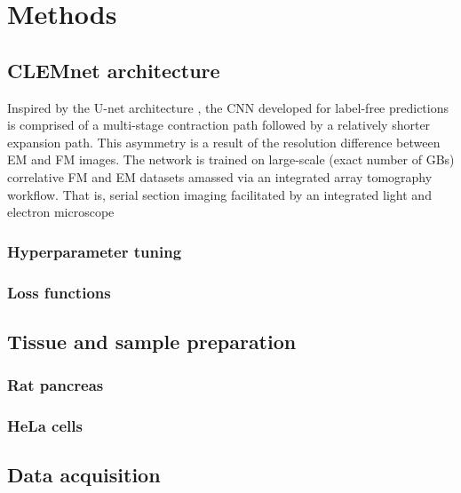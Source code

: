 \clearpage
\section{Methods}
\label{sec:4.4_methods}


\subsection{CLEMnet architecture}
\label{sec:4methods_architecture}

Inspired by the U-net architecture \cite{ronneberger2015u,ounkomol2018label}, the CNN developed for label-free predictions is comprised of a multi-stage contraction path followed by a relatively shorter expansion path. This asymmetry is a result of the resolution difference between EM and FM images. The network is trained on large-scale (exact number of GBs) correlative FM and EM datasets amassed via an integrated array tomography workflow. That is, serial section imaging facilitated by an integrated light and electron microscope \cite{liv2013simultaneous,lane2021optimization}


\subsubsection{Hyperparameter tuning}


\subsubsection{Loss functions}





\subsection{Tissue and sample preparation}
\label{sec:4methods_prep}

\subsubsection{Rat pancreas}
\label{sec:4methods_prep_rp}

\subsubsection{HeLa cells}


\subsection{Data acquisition}
\label{sec:4methods_acquisition}

